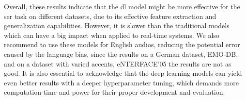 Overall, these results indicate that the \ac{dl} model might be more effective for the \ac{ser} task on different datasets, due to its effective feature extraction and generalization capabilities. However, it is slower than the traditional models which can have a big impact when applied to real-time systems. We also recommend to use these models for English audios, reducing the potential error caused by the language bias, since the results on a German dataset, EMO-DB, and on a dataset with varied accents, eNTERFACE'05 the results are not as good. It is also essential to acknowledge that the deep learning models can yield even better results with a deeper hyperparameter tuning, which demands more computation time and power for their proper  development and evaluation.


\begin{table}[H]
	\centering
	\caption{Final models trained on \ac{iemo} and evaluated on different datasets.}
	\label{final_models}
\end{table}


